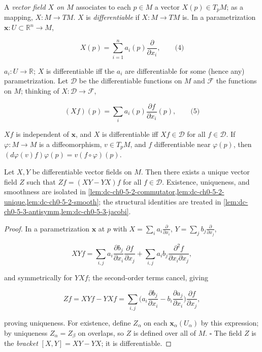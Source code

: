 \begin{definition}
  \label{def:dc-ch0-5-1}
  \leanok
  A \emph{vector field $X$ on $M$} associates to each $p\in M$ a vector $X(p)\in T_pM$;
  as a mapping, $X:M\to TM$. $X$ is \emph{differentiable} if $X:M\to TM$
  is. In a parametrization $\mathbf{x}:U\subset\mathbb{R}^n\to M$,
  
  $$
  X(p)=\sum_{i=1}^n a_i(p)\frac{\partial}{\partial x_i},\qquad\text{(4)}
  $$
  
  $a_i:U\to\mathbb{R}$; $X$ is differentiable iff the $a_i$ are differentiable for
  some (hence any) parametrization. Let $\mathcal{D}$ be the differentiable
  functions on $M$ and $\mathcal{F}$ the functions on $M$; thinking of
  $X:\mathcal{D}\to\mathcal{F}$,
  
  $$
  (Xf)(p)=\sum_i a_i(p)\frac{\partial f}{\partial x_i}(p),\qquad\text{(5)}
  $$
  
  $Xf$ is independent of $\mathbf{x}$, and $X$ is differentiable iff
  $Xf\in\mathcal{D}$ for all $f\in\mathcal{D}$. If $\varphi:M\to M$ is a
  diffeomorphism, $v\in T_pM$, and $f$ differentiable near $\varphi(p)$, then
  $(d\varphi(v)f)\varphi(p)=v(f\circ\varphi)(p)$.
\end{definition}

\begin{lemma}
  \label{lem:dc-ch0-5-2}
  \leanok
  Let $X,Y$ be differentiable vector fields on $M$. Then there exists a unique
  vector field $Z$ such that $Zf=(XY-YX)f$ for all $f\in\mathcal{D}$.
  Existence, uniqueness, and smoothness are isolated in
  \cref{lem:dc-ch0-5-2-commutator,lem:dc-ch0-5-2-unique,lem:dc-ch0-5-2-smooth};
  the structural identities are treated in \cref{lem:dc-ch0-5-3-antisymm,lem:dc-ch0-5-3-jacobi}.
\end{lemma}
\begin{proof}
  \sketch
  \leanok
  In a parametrization $\mathbf{x}$ at $p$ with
  $X=\sum_i a_i\frac{\partial}{\partial x_i}$,
  $Y=\sum_j b_j\frac{\partial}{\partial x_j}$,
  
  $$
  XYf=\sum_{i,j}a_i\frac{\partial b_j}{\partial x_i}\frac{\partial f}{\partial x_j}+\sum_{i,j}a_i b_j\frac{\partial^2 f}{\partial x_i\partial x_j},
  $$
  
  and symmetrically for $YXf$; the second-order terms cancel, giving
  
  $$
  Zf=XYf-YXf=\sum_{i,j}\Big(a_i\frac{\partial b_j}{\partial x_i}-b_i\frac{\partial a_j}{\partial x_i}\Big)\frac{\partial f}{\partial x_j},
  $$
  
  proving uniqueness. For existence, define $Z_\alpha$ on each
  $\mathbf{x}_\alpha(U_\alpha)$ by this expression; by uniqueness $Z_\alpha=Z_\beta$
  on overlaps, so $Z$ is defined over all of $M$. $\square$ The field $Z$ is the
  \emph{bracket} $[X,Y]=XY-YX$; it is differentiable.
\end{proof}

